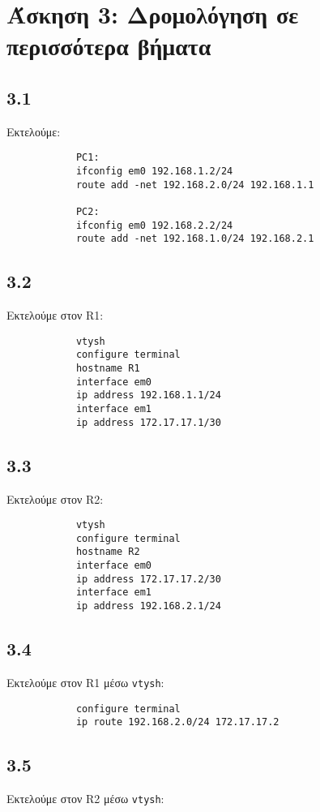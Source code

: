 \documentclass[a4paper, 12pt]{article}
\begin{document}
\section*{Άσκηση 3: Δρομολόγηση σε περισσότερα βήματα}

	\subsection*{3.1}
		Εκτελούμε: 
		
		\begin{verbatim}
			PC1:
			ifconfig em0 192.168.1.2/24
			route add -net 192.168.2.0/24 192.168.1.1
			
			PC2:
			ifconfig em0 192.168.2.2/24
			route add -net 192.168.1.0/24 192.168.2.1
		\end{verbatim}

	\subsection*{3.2}
		Εκτελούμε στον R1:
		
		\begin{verbatim}
			vtysh
			configure terminal
			hostname R1
			interface em0
			ip address 192.168.1.1/24
			interface em1
			ip address 172.17.17.1/30
		\end{verbatim}

	\subsection*{3.3}
		Εκτελούμε στον R2:
		
		\begin{verbatim}
			vtysh
			configure terminal
			hostname R2
			interface em0
			ip address 172.17.17.2/30
			interface em1
			ip address 192.168.2.1/24
		\end{verbatim}

	\subsection*{3.4}
		Εκτελούμε στον R1 μέσω \verb|vtysh|:
		
		\begin{verbatim}
			configure terminal
			ip route 192.168.2.0/24 172.17.17.2
		\end{verbatim}

	\subsection*{3.5}
		Εκτελούμε στον R2 μέσω \verb|vtysh|:
		
\end{document}
